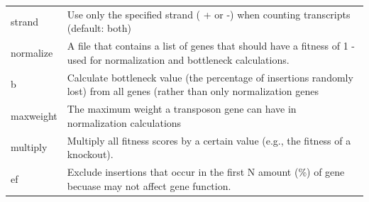 \documentclass[11pt,]{article}
\begin{document}
\begin{longtable}[]{@{}ll@{}}
\begin{minipage}[t]{0.08\columnwidth}\raggedright\strut
strand\strut
\end{minipage} & \begin{minipage}[t]{0.86\columnwidth}\raggedright\strut
Use only the specified strand ( + or -) when counting transcripts
(default: both)\strut
\end{minipage}\tabularnewline
\begin{minipage}[t]{0.08\columnwidth}\raggedright\strut
normalize\strut
\end{minipage} & \begin{minipage}[t]{0.86\columnwidth}\raggedright\strut
A file that contains a list of genes that should have a fitness of 1 -
used for normalization and bottleneck calculations.\strut
\end{minipage}\tabularnewline
\begin{minipage}[t]{0.08\columnwidth}\raggedright\strut
b\strut
\end{minipage} & \begin{minipage}[t]{0.86\columnwidth}\raggedright\strut
Calculate bottleneck value (the percentage of insertions randomly lost)
from all genes (rather than only normalization genes\strut
\end{minipage}\tabularnewline
\begin{minipage}[t]{0.08\columnwidth}\raggedright\strut
maxweight\strut
\end{minipage} & \begin{minipage}[t]{0.86\columnwidth}\raggedright\strut
The maximum weight a transposon gene can have in normalization
calculations\strut
\end{minipage}\tabularnewline
\begin{minipage}[t]{0.08\columnwidth}\raggedright\strut
multiply\strut
\end{minipage} & \begin{minipage}[t]{0.86\columnwidth}\raggedright\strut
Multiply all fitness scores by a certain value (e.g., the fitness of a
knockout).\strut
\end{minipage}\tabularnewline
\begin{minipage}[t]{0.08\columnwidth}\raggedright\strut
ef\strut
\end{minipage} & \begin{minipage}[t]{0.86\columnwidth}\raggedright\strut
Exclude insertions that occur in the first N amount (\%) of gene becuase
may not affect gene function.\strut
\end{minipage}\tabularnewline

\end{longtable}
\end{document}
